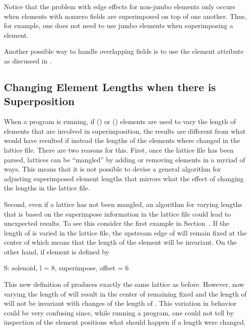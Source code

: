 Notice that the problem with edge effects for non-jumbo  elements only occurs when
elements with nonzero fields are superimposed on top of one another. Thus, for example, one does not
need to use jumbo elements when superimposing a  element.

Another possible way to handle overlapping fields is to use the  element
attribute as discussed in .

\subsection{Changing Element Lengths when there is Superposition}
\label{s:super.length}

When a program is running, if  () or  ()
elements are used to vary the length of elements that are involved in superimposition, the results
are different from what would have resulted if instead the lengths of the elements where changed in
the lattice file. There are two reasons for this. First, once the lattice file has been parsed,
lattices can be ``mangled'' by adding or removing elements in a myriad of ways. This means that it
is not possible to devise a general algorithm for adjusting superimposed element lengths that
mirrors what the effect of changing the lengths in the lattice file.

Second, even if a lattice has not been mangled, an algorithm for varying lengths that is based on
the superimpose information in the lattice file could lead to unexpected results. To see this
consider the first example in Section~. If the length of  is varied in the
lattice file, the upstream edge of  will remain fixed at the center of  which means that
the length of the  element  will be invariant. On the other hand, if
element  is defined by
\begin{example}
  S: solenoid, l = 8, superimpose, offset = 6
\end{example}
This new definition of  produces exactly the same lattice as before. However, now varying the
length of  will result in the center of  remaining fixed and the length of 
will not be invariant with changes of the length of . This variation in behavior could be very
confusing since, while running a program, one could not tell by inspection of the element positions
what should happen if a length were changed.


